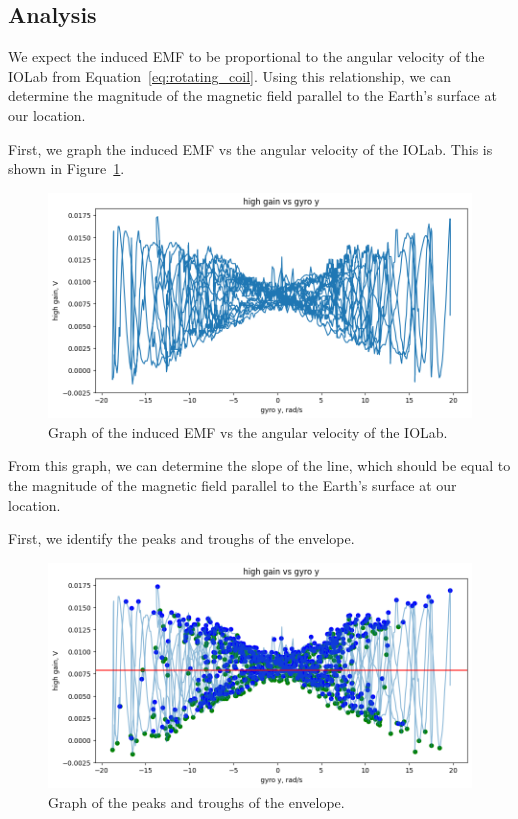 \documentclass[11pt]{article}
\begin{document}
    \subsection{Analysis}\label{subsec:part_1_analsysis}

    We expect the induced EMF to be proportional to the angular velocity of the IOLab from Equation~\ref{eq:rotating_coil}.
    Using this relationship, we can determine the magnitude of the magnetic field parallel to the Earth's surface at our location.

    First, we graph the induced EMF vs the angular velocity of the IOLab.
    This is shown in Figure~\ref{fig:part_1_graph}.

    \begin{figure}[H]
        \centering
        \includegraphics[width=0.8\linewidth]{resources/images/part 1 graph}
        \caption{Graph of the induced EMF vs the angular velocity of the IOLab.}
        \label{fig:part_1_graph}
    \end{figure}

    From this graph, we can determine the slope of the line, which should be equal to the magnitude of the magnetic field parallel to the Earth's surface at our location.

    First, we identify the peaks and troughs of the envelope.

    \begin{figure}[H]
        \centering
        \includegraphics[width=0.8\linewidth]{resources/images/part 1 peaks}
        \caption{Graph of the peaks and troughs of the envelope.}
        \label{fig:part_1_peaks_and_troughs}
    \end{figure}
\end{document}

